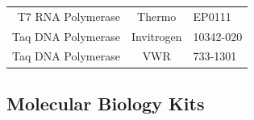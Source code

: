 \documentclass[11pt,singlespacinge,twoside]{reedthesis} %
\theoremstyle{definition}
\theoremstyle{definition}
\theoremstyle{definition}
\theoremstyle{remark}
\begin{document}
\begin{longtable}[]{@{}rcl@{}}
\begin{minipage}[t]{0.29\columnwidth}
T7 RNA Polymerase\strut
\end{minipage} & \begin{minipage}[t]{0.33\columnwidth}\centering
Thermo\strut
\end{minipage} & \begin{minipage}[t]{0.29\columnwidth}\raggedright
EP0111\strut
\end{minipage}\tabularnewline
\begin{minipage}[t]{0.29\columnwidth}\raggedleft
Taq DNA Polymerase\strut
\end{minipage} & \begin{minipage}[t]{0.33\columnwidth}\centering
Invitrogen\strut
\end{minipage} & \begin{minipage}[t]{0.29\columnwidth}\raggedright
10342-020\strut
\end{minipage}\tabularnewline
\begin{minipage}[t]{0.29\columnwidth}\raggedleft
Taq DNA Polymerase\strut
\end{minipage} & \begin{minipage}[t]{0.33\columnwidth}\centering
VWR\strut
\end{minipage} & \begin{minipage}[t]{0.29\columnwidth}\raggedright
733-1301\strut
\end{minipage}\tabularnewline
\bottomrule
\end{longtable}
\hypertarget{mat-mobikits}{%
\subsection{Molecular Biology Kits}\label{mat-mobikits}}
\end{document}
